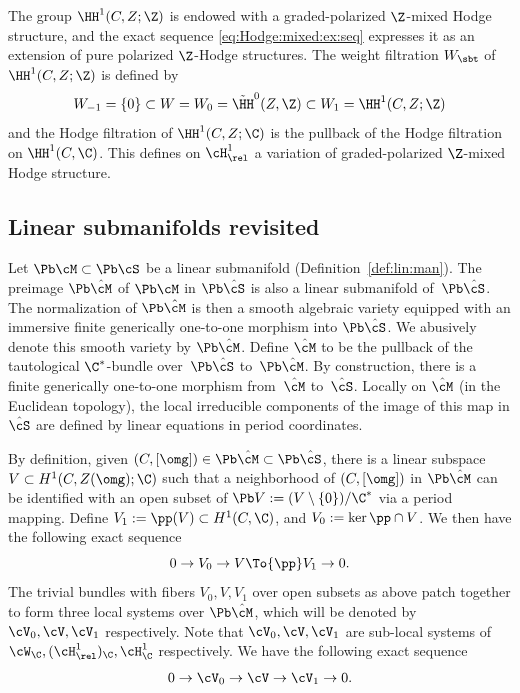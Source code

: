 The group $ \HH^1(C, Z; \Z) $ is endowed with a graded-polarized $\Z$-mixed Hodge structure, and the exact sequence \eqref{eq:Hodge:mixed:ex:seq} expresses it as an extension of pure polarized $\Z$-Hodge structures.
The weight filtration $W_{\sbt}$ of $\HH^1(C, Z; \Z)$ is defined by
\[ W_{-1} = \{0\} \subset W = W_0 = \tilde \HH^0(Z, \Z) \subset W_1 = \HH^1(C, Z;\Z)\]
and the Hodge filtration of $ \HH^1(C, Z; \C)$ is the pullback of the Hodge filtration on $\HH^1(C, \C)$.
This defines on $\cH^1_{\rel}$ a variation of graded-polarized $\Z$-mixed Hodge structure.

\subsection{Linear submanifolds revisited}\label{subsec:linsubrev}
Let $\Pb\cM\subset\Pb\cS$ be a linear submanifold (\cf Definition~\ref{def:lin:man}).
The preimage $\Pb\hat{\cM}$ of $\Pb\cM$ in $\Pb\hat{\cS}$ is also a linear submanifold of~$\Pb\hat{\cS}$.
The normalization of $\Pb\hat{\cM}$ is then a smooth algebraic variety equipped with an immersive finite generically one-to-one morphism into $\Pb\hat\cS$.
We abusively denote this smooth variety by $\Pb\hat\cM$.
Define $\hat\cM$ to be the pullback of the tautological $\C^*$-bundle over~$\Pb\hat\cS$ to~$\Pb\hat\cM$.
By construction, there is a finite generically one-to-one morphism from~$\hat{\cM}$ to~$\hat{\cS}$.
Locally on $\hat\cM$ (in the Euclidean topology), the local irreducible components of the image of this map in $\hat{\cS}$ are defined by linear equations in period coordinates.

By definition, given $(C,[\omg]) \in \Pb\hat{\cM} \subset \Pb\hat{\cS}$, there is a linear subspace $V \subset H^1(C,Z(\omg);\C)$ such that a neighborhood of $(C,[\omg])$ in $\Pb\hat{\cM}$ can be identified with an open subset of $\Pb V:=(V\setminus\{0\})/\C^*$ via a period mapping. Define $V_1:=\pp(V)\subset H^1(C,\C)$, and $V_0:=\ker\pp\cap V$. We then have the following \hbox{exact} sequence
\begin{equation}\label{eq:exact:seq:lin:subv}
0 \to V_0 \to V \To{\pp}V_1 \to 0.
\end{equation}
The trivial bundles with fibers $V_0,V,V_1$ over open subsets as above patch together to form three local systems over $\Pb\hat{\cM}$, which will be denoted by $\cV_0,\cV,\cV_1$ respectively.
Note that $\cV_0,\cV,\cV_1$ are sub-local systems of $\cW_{\C}, (\cH^1_{\rel})_{\C}, \cH^1_{\C}$ respectively. We have the following exact sequence
\begin{equation}\label{eq:exact:seq:loc:sys:lin:subv}
0 \to \cV_0 \to \cV \to \cV_1 \to 0.
\end{equation}

